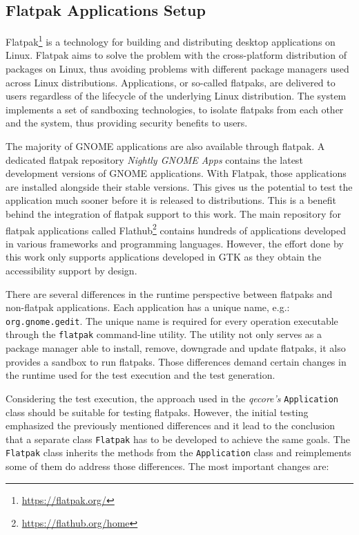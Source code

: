 \subsection{Flatpak Applications Setup}
Flatpak\footnote{\url{https://flatpak.org/}} is a technology for building and distributing desktop applications on Linux. Flatpak aims to solve the problem with the cross-platform distribution of packages on Linux, thus avoiding problems with different package managers used across Linux distributions. Applications, or so-called flatpaks, are delivered to users regardless of the lifecycle of the underlying Linux distribution. The system implements a set of sandboxing technologies, to isolate flatpaks from each other and the system, thus providing security benefits to users.\cite{flatpak}

The majority of GNOME applications are also available through flatpak. A dedicated flatpak repository \textit{Nightly GNOME Apps} contains the latest development versions of GNOME applications. With Flatpak, those applications are installed alongside their stable versions. This gives us the potential to test the application much sooner before it is released to distributions. This is a benefit behind the integration of flatpak support to this work. The main repository for flatpak applications called Flathub\footnote{\url{https://flathub.org/home}} contains hundreds of applications developed in various frameworks and programming languages. However, the effort done by this work only supports applications developed in GTK as they obtain the accessibility support by design.

There are several differences in the runtime perspective between flatpaks and non-flatpak applications. Each application has a unique name, e.g.: \texttt{org.gnome.gedit}. The unique name is required for every operation executable through the \texttt{flatpak} command-line utility. The utility not only serves as a package manager able to install, remove, downgrade and update flatpaks, it also provides a sandbox to run flatpaks. Those differences demand certain changes in the runtime used for the test execution and the test generation. 

Considering the test execution, the approach used in the \textit{qecore's} \texttt{Application} class should be suitable for testing flatpaks. However, the initial testing emphasized the previously mentioned differences and it lead to the conclusion that a separate class \texttt{Flatpak} has to be developed to achieve the same goals. The \texttt{Flatpak} class inherits the methods from the \texttt{Application} class and reimplements some of them do address those differences. The most important changes are:

